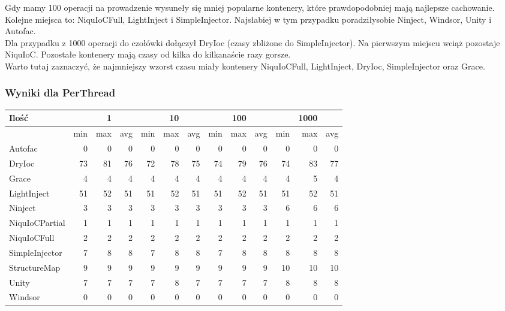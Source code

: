 \documentclass[12pt]{article}
\begin{document}
Gdy mamy 100 operacji na prowadzenie wysuneły się mniej popularne kontenery, które prawdopodobniej mają najlepsze cachowanie. Kolejne miejsca to: NiquIoCFull, LightInject i SimpleInjector. Najsłabiej w tym przypadku poradziłysobie Ninject, Windsor, Unity i Autofac.\\
Dla przypadku z 1000 operacji do czołówki dołączył DryIoc (czasy zbliżone do SimpleInjector). Na pierwszym miejscu wciąż pozostaje NiquIoC. Pozostałe kontenery mają czasy od kilka do kilkanaście razy gorsze.\\
Warto tutaj zaznaczyć, że najmniejszy wzorst czasu miały kontenery NiquIoCFull, LightInject, DryIoc, SimpleInjector oraz Grace.

\subsubsection{Wyniki dla PerThread}
\begin{center}
\begin{small}
	\begin{tabular}{ | l | r r r | r r r | r r r | r r r | }
    		\hline
     		Ilość & & 1 & & & 10 & & & 100 & & & 1000 & \\ \hline
     		 & min & max & avg & min & max & avg & min & max & avg & min & max & avg \\ \hline
    		Autofac & 0 & 0 & 0 & 0 & 0 & 0 & 0 & 0 & 0 & 0 & 0 & 0 \\ \hline
   		DryIoc & 73 & 81 & 76 & 72 & 78 & 75 & 74 & 79 & 76 & 74 & 83 & 77 \\ \hline
		Grace & 4 & 4 & 4 & 4 & 4 & 4 & 4 & 4 & 4 & 4 & 5 & 4 \\ \hline
		LightInject & 51 & 52 & 51 & 51 & 52 & 51 & 51 & 52 & 51 & 51 & 52 & 51 \\ \hline
		Ninject & 3 & 3 & 3 & 3 & 3 & 3 & 3 & 3 & 3 & 6 & 6 & 6 \\ \hline
		NiquIoCPartial & 1 & 1 & 1 & 1 & 1 & 1 & 1 & 1 & 1 & 1 & 1 & 1 \\ \hline
		NiquIoCFull & 2 & 2 & 2 & 2 & 2 & 2 & 2 & 2 & 2 & 2 & 2 & 2 \\ \hline
		SimpleInjector & 7 & 8 & 8 & 7 & 8 & 8 & 7 & 8 & 8 & 8 & 8 & 8 \\ \hline
		StructureMap & 9 & 9 & 9 & 9 & 9 & 9 & 9 & 9 & 9 & 10 & 10 & 10 \\ \hline
		Unity & 7 & 7 & 7 & 7 & 8 & 7 & 7 & 7 & 7 & 8 & 8 & 8 \\ \hline
		Windsor & 0 & 0 & 0 & 0 & 0 & 0 & 0 & 0 & 0 & 0 & 0 & 0 \\
    		\hline
  	\end{tabular}
\end{small}
\end{center}
\end{document}
